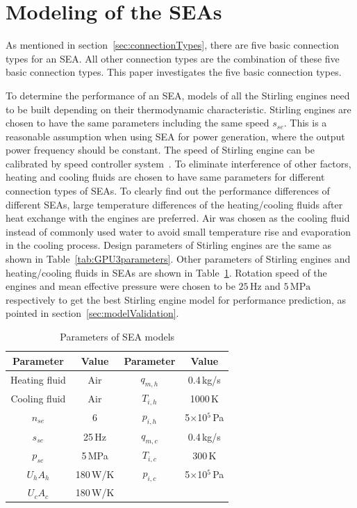 \documentclass[review,3p,10t]{elsarticle}
\begin{document}
\section{Modeling of the SEAs}

As mentioned in section~\ref{sec:connectionTypes}, there are five basic connection types for an SEA. All other connection types are the combination of these five basic connection types. This paper investigates the five basic connection types.

To determine the performance of an SEA, models of all the Stirling engines need to be built depending on their thermodynamic characteristic. Stirling engines are chosen to have the same parameters including the same speed $s_{se}$. This is a reasonable assumption when using SEA for power generation, where the output power frequency should be constant. The speed of Stirling engine can be calibrated by speed controller system~\cite{Hooshang2016}. To eliminate interference of other factors, heating and cooling fluids are chosen to have same parameters for different connection types of SEAs. To clearly find out the performance differences of different SEAs, large temperature differences of the heating/cooling fluids after heat exchange with the engines are preferred. Air was chosen as the cooling fluid instead of commonly used water to avoid small temperature rise and evaporation in the cooling process. Design parameters of Stirling engines are the same as shown in Table~\ref{tab:GPU3parameters}. Other parameters of Stirling engines and heating/cooling fluids in SEAs are shown in Table~\ref{tab:parameters}. Rotation speed of the engines and mean effective pressure were chosen to be $25\,\mathrm{Hz}$ and $5\,\mathrm{MPa}$ respectively to get the best Stirling engine model for performance prediction, as pointed in section~\ref{sec:modelValidation}.

\begin{table}[htbp]
	\caption{Parameters of SEA models}
	\begin{center}
	\begin{tabular}{cccc}
		\toprule
		Parameter		&	Value	& Parameter	&	Value\\
		\midrule
		Heating fluid	&	Air		&	$q_{m,h}$	&	0.4\,kg/s\\
		Cooling fluid	&	Air	&	$T_{i,h}$	&	1000\,K\\
		$n_{se}$	&	6	&	$p_{i,h}$	&	5$\times$10$^5$\,Pa\\
		$s_{se}$	&	25\,Hz	&	$q_{m,c}$	&	0.4\,kg/s\\
		$p_{se}$		&	5\,MPa	&	$T_{i,c}$	&	300\,K\\
		$U_hA_h$	&	180\,W/K	&	$p_{i,c}$	&	5$\times$10$^5$\,Pa\\
		$U_cA_c$		&	180\,W/K	&&\\
		\bottomrule
	\end{tabular}
	\end{center}
	\label{tab:parameters}
\end{table}
\end{document}
